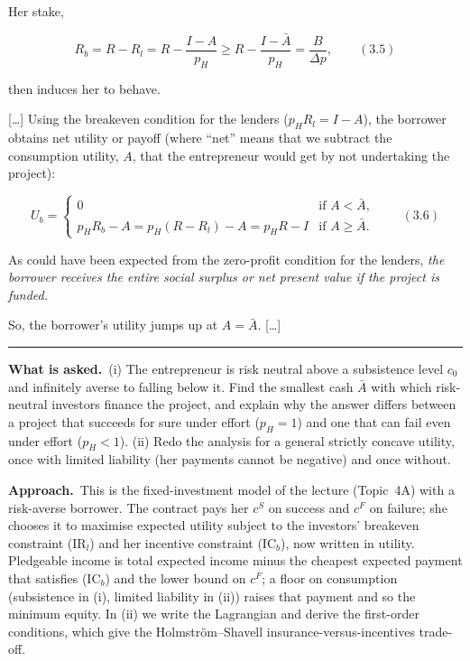\documentclass[11pt,a4paper]{article}
\newcommand{\asked}{\par\medskip\noindent\textbf{What is asked.}~}
\newcommand{\approach}{\par\smallskip\noindent\textbf{Approach.}~}
\newcommand{\stmtend}{\par\endgroup\nopagebreak\noindent\rule{\linewidth}{0.4pt}\par\medskip}
\begin{document}
Her stake,

\[R_b = R - R_l = R - \frac{I - A}{p_H} \geqslant R - \frac{I - \bar A}{p_H} = \frac{B}{\Delta p}, \qquad (3.5)\]

then induces her to behave.

{[}\ldots{]} Using the breakeven condition for the lenders (\(p_H R_l = I - A\)), the borrower
obtains net utility or payoff (where ``net'' means that we subtract the consumption utility, \(A\),
that the entrepreneur would get by not undertaking the project):

\[U_b = \begin{cases} 0 & \text{if } A < \bar A, \\ p_H R_b - A = p_H(R - R_l) - A = p_H R - I & \text{if } A \geqslant \bar A. \end{cases} \qquad (3.6)\]

As could have been expected from the zero-profit condition for the lenders, \emph{the borrower
receives the entire social surplus or net present value if the project is funded.}

So, the borrower's utility jumps up at \(A = \bar A\). {[}\ldots{]}
\stmtend

\asked (i) The entrepreneur is risk neutral above a subsistence level $c_0$ and infinitely averse
to falling below it. Find the smallest cash $\bar A$ with which risk-neutral investors finance the
project, and explain why the answer differs between a project that succeeds for sure under effort
($p_H=1$) and one that can fail even under effort ($p_H<1$). (ii) Redo the analysis for a general
strictly concave utility, once with limited liability (her payments cannot be negative) and once
without.

\approach This is the fixed-investment model of the lecture (Topic~4A) with a risk-averse
borrower. The contract pays her $c^S$ on success and $c^F$ on failure; she chooses it to maximise
expected utility subject to the investors' breakeven constraint (IR$_l$) and her incentive
constraint (IC$_b$), now written in utility. Pledgeable income is total expected income minus the
cheapest expected payment that satisfies (IC$_b$) and the lower bound on $c^F$; a floor on
consumption (subsistence in (i), limited liability in (ii)) raises that payment and so the minimum
equity. In (ii) we write the Lagrangian and derive the first-order conditions, which give the
Holmstr\"om--Shavell insurance-versus-incentives trade-off.
\end{document}
